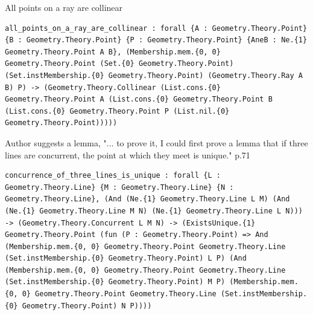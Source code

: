 \begin{theorem}
  \label{Geometry.Theory.Line.all_points_on_a_ray_are_collinear}
  \leanok
  All points on a ray are collinear 
\begin{verbatim}all_points_on_a_ray_are_collinear : forall {A : Geometry.Theory.Point} {B : Geometry.Theory.Point} {P : Geometry.Theory.Point} {AneB : Ne.{1} Geometry.Theory.Point A B}, (Membership.mem.{0, 0} Geometry.Theory.Point (Set.{0} Geometry.Theory.Point) (Set.instMembership.{0} Geometry.Theory.Point) (Geometry.Theory.Ray A B) P) -> (Geometry.Theory.Collinear (List.cons.{0} Geometry.Theory.Point A (List.cons.{0} Geometry.Theory.Point B (List.cons.{0} Geometry.Theory.Point P (List.nil.{0} Geometry.Theory.Point)))))\end{verbatim}
\end{theorem}

\begin{theorem}
  \label{Geometry.Theory.Line.concurrence_of_three_lines_is_unique}
  \leanok
  Author suggests a lemma, "... to prove it, I could first prove a lemma that if three lines are concurrent, the point at which they meet is unique." p.71 
\begin{verbatim}concurrence_of_three_lines_is_unique : forall {L : Geometry.Theory.Line} {M : Geometry.Theory.Line} {N : Geometry.Theory.Line}, (And (Ne.{1} Geometry.Theory.Line L M) (And (Ne.{1} Geometry.Theory.Line M N) (Ne.{1} Geometry.Theory.Line L N))) -> (Geometry.Theory.Concurrent L M N) -> (ExistsUnique.{1} Geometry.Theory.Point (fun (P : Geometry.Theory.Point) => And (Membership.mem.{0, 0} Geometry.Theory.Point Geometry.Theory.Line (Set.instMembership.{0} Geometry.Theory.Point) L P) (And (Membership.mem.{0, 0} Geometry.Theory.Point Geometry.Theory.Line (Set.instMembership.{0} Geometry.Theory.Point) M P) (Membership.mem.{0, 0} Geometry.Theory.Point Geometry.Theory.Line (Set.instMembership.{0} Geometry.Theory.Point) N P))))\end{verbatim}
\end{theorem}

